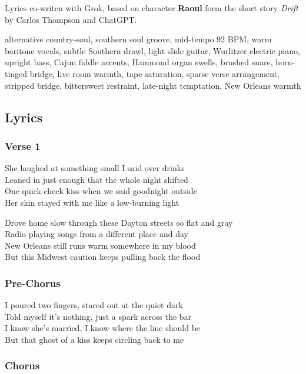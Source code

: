 Lyrics co-writen with Grok, based on character \textbf{Raoul} form the
short story \emph{Drift} by Carlos Thompson and ChatGPT.

alternative country-soul, southern soul groove, mid-tempo 92 BPM, warm
baritone vocals, subtle Southern drawl, light slide guitar, Wurlitzer
electric piano, upright bass, Cajun fiddle accents, Hammond organ
swells, brushed snare, horn-tinged bridge, live room warmth, tape
saturation, sparse verse arrangement, stripped bridge, bittersweet
restraint, late-night temptation, New Orleans warmth

\subsection{Lyrics}\label{lyrics-39}

\subsubsection{Verse 1}\label{verse-1-28}

She laughed at something small I said over drinks\\
Leaned in just enough that the whole night shifted\\
One quick cheek kiss when we said goodnight outside\\
Her skin stayed with me like a low-burning light

Drove home slow through these Dayton streets so flat and gray\\
Radio playing songs from a different place and day\\
New Orleans still runs warm somewhere in my blood\\
But this Midwest caution keeps pulling back the flood

\subsubsection{Pre-Chorus}\label{pre-chorus-68}

I poured two fingers, stared out at the quiet dark\\
Told myself it's nothing, just a spark across the bar\\
I know she's married, I know where the line should be\\
But that ghost of a kiss keeps circling back to me

\subsubsection{Chorus}\label{chorus-80}

